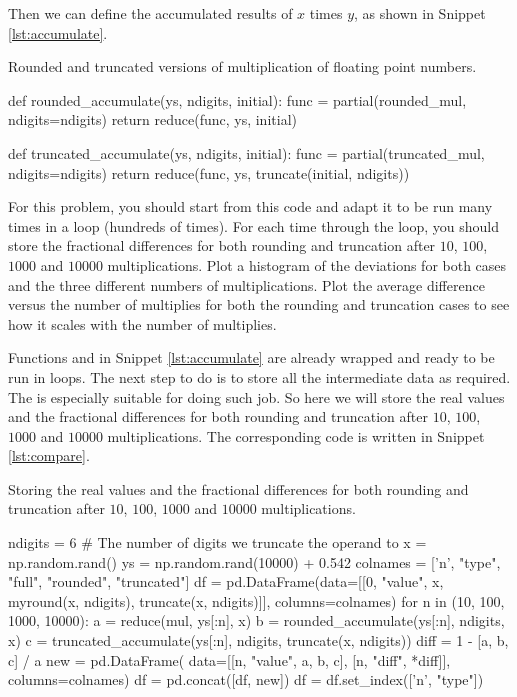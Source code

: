 Then we can define the accumulated results of \(x\) times \(y\), as shown in Snippet
\ref{lst:accumulate}.

\begin{algorithm}
    \caption{Rounded and truncated versions of multiplication of floating point numbers.}
    \label{lst:accumulate}
    \begin{pythoncode}
        def rounded_accumulate(ys, ndigits, initial):
            func = partial(rounded_mul, ndigits=ndigits)
            return reduce(func, ys, initial)


        def truncated_accumulate(ys, ndigits, initial):
            func = partial(truncated_mul, ndigits=ndigits)
            return reduce(func, ys, truncate(initial, ndigits))
    \end{pythoncode}
\end{algorithm}

\Question For this problem, you should start from this code and adapt it to be run many times in a
loop (hundreds of times). For each time through the loop, you should store the fractional
differences for both rounding and truncation after \(10\), \(100\), \(1000\) and \(10000\) multiplications.
Plot a histogram of the deviations for both cases and the three different numbers of
multiplications. Plot the average difference versus the number of multiplies for both the
rounding and truncation cases to see how it scales with the number of multiplies.

\Answer Functions  and  in Snippet
\ref{lst:accumulate} are already wrapped and ready to be run in loops.
The next step to do is to store all the intermediate data as required.
The  is especially suitable for doing such job.
So here we will store the real values and the fractional
differences for both rounding and truncation after \(10\), \(100\), \(1000\) and \(10000\)
multiplications.
The corresponding code is written in Snippet \ref{lst:compare}.

\begin{algorithm}
    \caption{Storing the real values and the fractional
        differences for both rounding and truncation after \(10\), \(100\), \(1000\) and \(10000\)
        multiplications.}
    \label{lst:compare}
    \begin{pythoncode}
        ndigits = 6  # The number of digits we truncate the operand to
        x = np.random.rand()
        ys = np.random.rand(10000) + 0.542
        colnames = ['n', "type", "full", "rounded", "truncated"]
        df = pd.DataFrame(data=[[0, "value", x, myround(x, ndigits), truncate(x, ndigits)]],
                          columns=colnames)
        for n in (10, 100, 1000, 10000):
            a = reduce(mul, ys[:n], x)
            b = rounded_accumulate(ys[:n], ndigits, x)
            c = truncated_accumulate(ys[:n], ndigits, truncate(x, ndigits))
            diff = 1 - [a, b, c] / a
            new = pd.DataFrame(
                data=[[n, "value", a, b, c], [n, "diff", *diff]], columns=colnames)
            df = pd.concat([df, new])
        df = df.set_index(['n', "type"])
    \end{pythoncode}
\end{algorithm}


